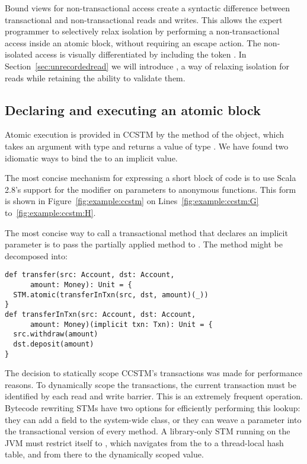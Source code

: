 Bound views for non-transactional access create a syntactic difference
between transactional and non-transactional reads and writes.
This allows the expert programmer to selectively relax isolation by
performing a non-transactional access inside an atomic block, without
requiring an escape action.  The non-isolated access
is visually differentiated by including the token .  In
Section~\ref{sec:unrecordedread} we will introduce ,
a way of relaxing isolation for reads while retaining the ability to
validate them.

\subsection{Declaring and executing an atomic block}

Atomic execution is provided in CCSTM by the  method of
the  object, which takes an argument with type
 and returns a value of type .
We have found two idiomatic ways to bind the  to an implicit
value.

The most concise mechanism for expressing a short block of code is to use
Scala 2.8's support for the  modifier on parameters to
anonymous functions.  This form is shown in Figure~\ref{fig:example:ccstm}
on Lines~\ref{fig:example:ccstm:G} to~\ref{fig:example:ccstm:H}.

The most concise way to call a transactional method that declares an implicit
 parameter is to pass the partially applied method to
.  The  method
might be decomposed into:
\lstset{numbers=none}
\lstset{xleftmargin=0.125in}
\begin{lstlisting}
def transfer(src: Account, dst: Account,
      amount: Money): Unit = {
  STM.atomic(transferInTxn(src, dst, amount)(_))
}
def transferInTxn(src: Account, dst: Account,
      amount: Money)(implicit txn: Txn): Unit = {
  src.withdraw(amount)
  dst.deposit(amount)
}
\end{lstlisting}
\lstset{numbers=left}
\lstset{xleftmargin=0.25in}


The decision to statically scope CCSTM's transactions was made for
performance reasons.  To dynamically scope the transactions, the
current transaction must be identified by each read and write barrier.
This is an extremely frequent operation.  Bytecode rewriting STMs have
two options for efficiently performing this lookup: they can add a field
to the system-wide  class, or they can weave a 
parameter into the transactional version of every method.  A library-only
STM running on the JVM must restrict itself to ,
which navigates from the  to a thread-local hash table,
and from there to the dynamically scoped value.

